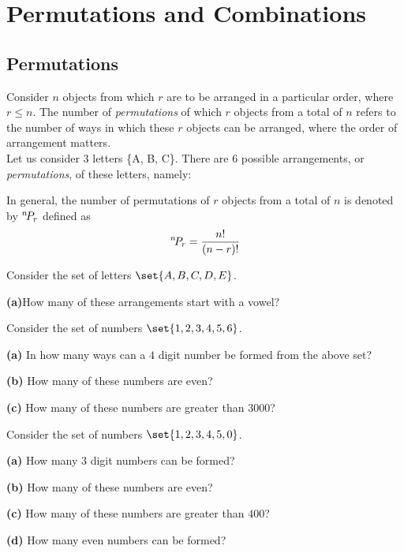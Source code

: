 \newcommand*{\perm}[1][-3mu]{\permcomb[#1]{P}}
\newcommand*{\permcomb}[4][0mu]{{{}^{#3}\mkern#1#2_{#4}}}



	\chapter{Permutations and Combinations}
	\section{Permutations}
	Consider $n$ objects from which $r$ are to be arranged in a particular order, where $r \leq n$. The number of \textit{permutations} of which $r$ objects from a total of $n$ refers to the number of ways in which these $r$ objects can be arranged, where the order of arrangement matters.\\
	
	
	Let us consider $3$ letters \{A, B, C\}. There are $6$ possible arrangements, or \textit{permutations}, of these letters, namely:
	\begin{center}
	\end{center}
	In general, the number of permutations of $r$ objects from a total of $n$ is denoted by $\perm n r$ defined as \[\perm n r = \dfrac{n!}{(n-r)!}\]
	
	\begin{example}
		Consider the set of letters $\set{A,B,C,D,E}$. 
		
		\quad\textbf{(a)}How many of these arrangements start with a vowel?
	\end{example}
	
	\begin{example}
		Consider the set of numbers $\set{1,2,3,4,5,6}$.
		
		\quad\textbf{(a)} In how many ways can a $4$ digit number be formed from the above set? 
		
		\quad\textbf{(b)} How many of these numbers are even? 
		
		\quad\textbf{(c)} How many of these numbers are greater than 3000?
	\end{example}
	
	\begin{example}
		Consider the set of numbers $\set{1,2,3,4,5,0}$.
		
		\quad\textbf{(a)} How many $3$ digit numbers can be formed?
		
		\quad\textbf{(b)} How many of these numbers are even?
		
		\quad\textbf{(c)} How many of these numbers are greater than $400$?
		
		\quad\textbf{(d)} How many even numbers can be formed?
	\end{example} 
	
